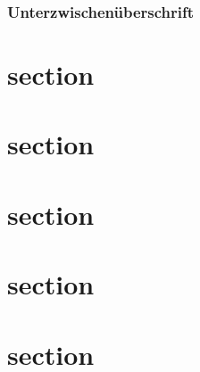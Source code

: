 \documentclass[ngerman]{scrartcl}
\begin{document}
	\lipsum[1-1]

	\subsubsection*{Unterzwischenüberschrift}

	\lipsum[1-1]



	\section{section}
	\lipsum[1-5]

	\section{section}
	\lipsum[1-5]

	\section{section}
	\lipsum[1-5]

	\section{section}
	\lipsum[1-5]

	\section{section}
	\lipsum[1-25]
\end{document}
